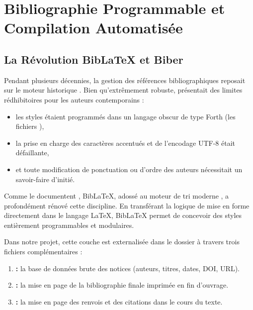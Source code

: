 \chapter{Bibliographie Programmable et Compilation Automatisée}
\label{chap:biblio-compilation}

\section{La Révolution Bib\LaTeX{} et Biber}
\label{sec:biblatex-biber}

Pendant plusieurs décennies, la gestion des références bibliographiques reposait sur le moteur historique .
Bien qu'extrêmement robuste,  présentait des limites rédhibitoires pour les auteurs contemporains :
\begin{itemize}
  \item les styles étaient programmés dans un langage obscur de type Forth (les fichiers ),
  \item la prise en charge des caractères accentués et de l'encodage UTF-8 était défaillante,
  \item et toute modification de ponctuation ou d'ordre des auteurs nécessitait un savoir-faire d'initié.
\end{itemize}

Comme le documentent \textcite{lehman2024biblatex}, Bib\LaTeX{}, adossé au moteur de tri moderne ,
a profondément rénové cette discipline.
En transférant la logique de mise en forme directement dans le langage \LaTeX{},
Bib\LaTeX{} permet de concevoir des styles entièrement programmables et modulaires.

Dans notre projet, cette couche est externalisée dans le dossier 
à travers trois fichiers complémentaires :
\begin{enumerate}
  \item \textbf{ :} la base de données brute des notices (auteurs, titres, dates, DOI, URL).
  \item \textbf{ :} la mise en page de la bibliographie finale imprimée en fin d'ouvrage.
  \item \textbf{ :} la mise en page des renvois et des citations dans le cours du texte.
\end{enumerate}

